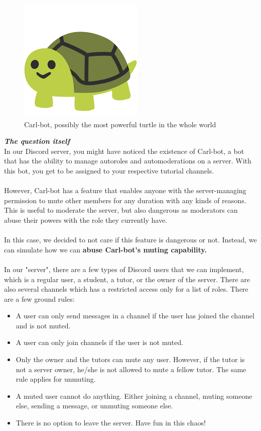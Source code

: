 \begin{figure}
    \begin{center}
        \includegraphics[scale=0.4]{carlbot.png}
    \end{center}
    \captionsetup{labelformat=empty}
    \caption{Carl-bot, possibly the most powerful turtle in the whole world}
\end{figure}

\textbf{\textit{The question itself}} \\
In our Discord server, you might have noticed the existence of Carl-bot, a bot that has the ability to manage autoroles 
and automoderations on a server. With this bot, you get to be assigned to your respective tutorial channels. \\ \\
However, Carl-bot has a feature that enables anyone with the server-managing permission to mute other members for any duration with any kinds of reasons. This is useful to moderate the server, but also dangerous as moderators can abuse their powers with the role they currently have. \\ \\
In this case, we decided to not care if this feature is dangerous or not. Instead, we can simulate how we can \textbf{abuse Carl-bot's muting capability.} \\ \\
In our "server", there are a few types of Discord users that we can implement, which is a regular user, a student, a tutor, or the owner of the server. There are also several channels which has a restricted access only for a list of roles. There are a few ground rules:
\begin{itemize}
    \item A user can only send messages in a channel if the user has joined the channel and is not muted.
    \item A user can only join channels if the user is not muted.
    \item Only the owner and the tutors can mute any user. However, if the tutor is not a server owner, he/she is not 
    allowed to mute a fellow tutor. The same rule applies for unmuting.
    \item A muted user cannot do anything. Either joining a channel, muting someone else, sending a message, or 
    unmuting someone else.
    \item There is no option to leave the server. Have fun in this chaos!
\end{itemize}

